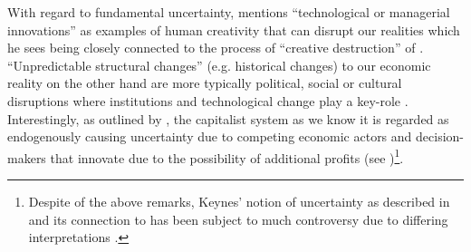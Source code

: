 \documentclass[a4paper,11pt,listof=nochaptergap,oneside,pointednumbers,bibtotoc,bigheadings,liststotoc,hidelinks]{scrbook}
\theoremstyle{mysatz}
\theoremstyle{mydefinition}
\theoremstyle{mytheorem}
\theoremstyle{mybemerkung}
\begin{document}
With regard to fundamental uncertainty, \citet[p. 48]{dequesh:00} mentions ``technological or managerial innovations'' as examples of human creativity that can disrupt our realities which he sees being closely connected to the process of ``creative destruction'' of \citet{schumpeter:42}. ``Unpredictable structural changes'' (e.g. historical changes) to our economic reality on the other hand are more typically political, social or cultural disruptions where institutions and technological change play a key-role \citep[p. 49]{dequesh:00}. Interestingly, as outlined by \citet{dequesh:00}, the capitalist system as we know it is regarded as endogenously causing uncertainty due to competing economic actors and decision-makers that innovate due to the possibility of additional profits (see \citealp{kregel:87})\footnote{Despite of the above remarks, Keynes' notion of uncertainty as described in \citet{keynes:21} and its connection to \citet{keynes:37} has been subject to much controversy due to differing interpretations \citep{dequesh:00}.}.
\end{document}
